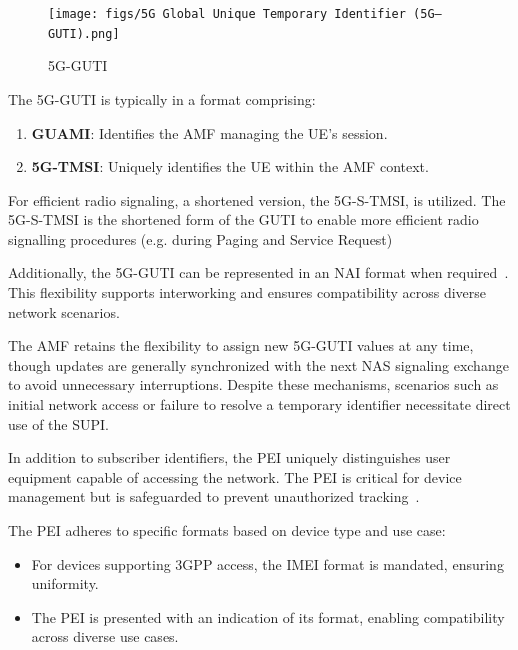 \begin{figure}
    \centering
    \texttt{[image: figs/5G Global Unique Temporary Identifier (5G–GUTI).png]}
    \caption{\ac{5G-GUTI}}
    \label{fig:5G Global Unique Temporary Identifier (5G–GUTI)}
\end{figure}

The \ac{5G-GUTI} is typically in a format comprising:

\begin{enumerate}
    \item {
        \textbf{\ac{GUAMI}}: Identifies the \ac{AMF} managing the \ac{UE}'s session.
    }
    \item {
        \textbf{\ac{5G-TMSI}}: Uniquely identifies the \ac{UE} within the \ac{AMF} context.
    }
\end{enumerate}

For efficient radio signaling, a shortened version, the \ac{5G-S-TMSI}, is utilized. The \ac{5G-S-TMSI} is the shortened form of the \ac{GUTI} to enable more efficient radio signalling procedures (e.g. during Paging and Service Request)

Additionally, the \ac{5G-GUTI} can be represented in an \ac{NAI} format when required~\cite{23.003-p29}. This flexibility supports interworking and ensures compatibility across diverse network scenarios.

The \ac{AMF} retains the flexibility to assign new \ac{5G-GUTI} values at any time, though updates are generally synchronized with the next \ac{NAS} signaling exchange to avoid unnecessary interruptions. Despite these mechanisms, scenarios such as initial network access or failure to resolve a temporary identifier necessitate direct use of the \ac{SUPI}.

In addition to subscriber identifiers, the \ac{PEI} uniquely distinguishes user equipment capable of accessing the network. The \ac{PEI} is critical for device management but is safeguarded to prevent unauthorized tracking~\cite{23.501-p243}.

The \ac{PEI} adheres to specific formats based on device type and use case:
\begin{itemize}
    \item {
        For devices supporting \ac{3GPP} access, the \ac{IMEI} format is mandated, ensuring uniformity.
    }
    \item {
        The \ac{PEI} is presented with an indication of its format, enabling compatibility across diverse use cases.
    }
\end{itemize}


